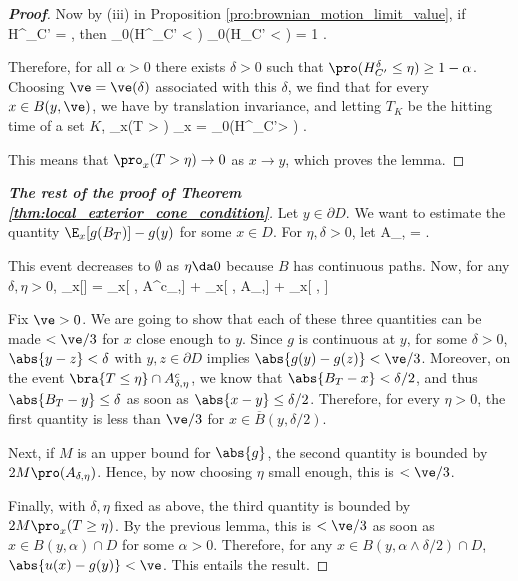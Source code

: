 \begin{proof}[\bf Proof]
Now by (iii) in Proposition \ref{pro:brownian_motion_limit_value}, if
\be
H^\delta_{C'} = \inf{},
\ee
then
\be
\pro_0(H^\delta_{C'} < \eta) \to \pro_0(H_{C'} < \eta) = 1 \quad {}\delta {}.
\ee

Therefore, for all $\alpha > 0$ there exists $\delta > 0$ such that $\pro(H^\delta_{C'} \leq \eta) \geq 1 - \alpha$. Choosing $\ve = \ve(\delta)$ associated with this $\delta$, we find that for every $x \in B(y, \ve)$, we have by translation invariance, and letting $T_K$ be the hitting time of a set $K$,
\be
\pro_x(T > \eta) \leq \pro_x = \pro_0(H^\delta_{C'}> \eta) \leq \alpha \quad {}.
\ee

This means that $\pro_x(T > \eta) \to 0$ as $x \to y$, which proves the lemma.
\end{proof}

\begin{proof}[\bf The rest of the proof of Theorem \ref{thm:local_exterior_cone_condition}]
Let $y \in \partial D$. We want to estimate the quantity $\E_x[g(B_T)] - g(y)$ for some $x \in D$. For $\eta, \delta > 0$, let 
\be
A_{\eta,\delta} = .
\ee

This event decreases to $\emptyset$ as $\eta \da 0$ because $B$ has continuous paths. Now, for any $\delta, \eta > 0$,
\beast
\E_x[] = \E_x[ , \cap A^c_{\delta,\eta}] + \E_x[ ,  \cap A_{\delta,\eta}] + \E_x[ , ]
\eeast

Fix $\ve > 0$. We are going to show that each of these three quantities can be made $< \ve/3$ for $x$ close enough to $y$. Since $g$ is continuous at $y$, for some $\delta > 0$, $\abs{y-z} < \delta$ with $y, z \in \partial D$ implies $\abs{g(y) - g(z)} < \ve/3$. Moreover, on the event $\bra{T \leq \eta }\cap A^c_{\delta,\eta}$, we know that $\abs{B_T - x} < \delta/2$, and thus $\abs{B_T - y} \leq \delta$ as soon as $\abs{x - y} \leq \delta/2$. Therefore, for every $\eta > 0$, the first quantity is less than $\ve/3$ for $x \in \overline{B}(y, \delta/2)$.

Next, if $M$ is an upper bound for $\abs{g}$, the second quantity is bounded by $2M\pro(A_{\delta,\eta})$. Hence, by now choosing $\eta$ small enough, this is $< \ve/3$.

Finally, with $\delta, \eta$ fixed as above, the third quantity is bounded by $2M\pro_x(T \geq \eta)$. By the previous lemma, this is $< \ve/3$ as soon as $x \in B(y, \alpha) \cap D$ for some $\alpha > 0$. Therefore, for any $x \in B(y, \alpha \land \delta/2) \cap D$, $\abs{u(x) - g(y)} <\ve$. This entails the result.
\end{proof}


